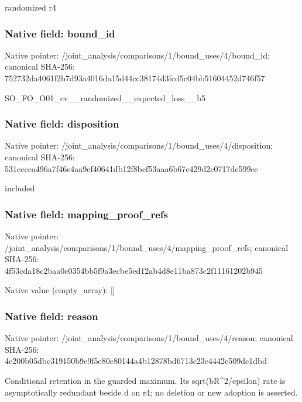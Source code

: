 \documentclass[10pt,a4paper]{article}
\begin{document}
\begingroup\raggedright\sloppy randomized r4\par\endgroup

\subsubsection{Native field: bound\_\allowbreak{}id}
Native pointer: /joint\_\allowbreak{}analysis/comparisons/1/bound\_\allowbreak{}uses/4/bound\_\allowbreak{}id; canonical SHA-256: 752732da4061f2b7d93a4016da15d44cc38174d3fcd5c04bb51604452d746f57

\begingroup\raggedright\sloppy SO\_\allowbreak{}FO\_\allowbreak{}O01\_\allowbreak{}cv\_\allowbreak{}\_\allowbreak{}randomized\_\allowbreak{}\_\allowbreak{}expected\_\allowbreak{}loss\_\allowbreak{}\_\allowbreak{}b5\par\endgroup

\subsubsection{Native field: disposition}
Native pointer: /joint\_\allowbreak{}analysis/comparisons/1/bound\_\allowbreak{}uses/4/disposition; canonical SHA-256: 531cecca496a7f46e4aa9ef40641db12f8bef53aaa6b67c429d2c0717dc599ce

\begingroup\raggedright\sloppy included\par\endgroup

\subsubsection{Native field: mapping\_\allowbreak{}proof\_\allowbreak{}refs}
Native pointer: /joint\_\allowbreak{}analysis/comparisons/1/bound\_\allowbreak{}uses/4/mapping\_\allowbreak{}proof\_\allowbreak{}refs; canonical SHA-256: 4f53cda18c2baa0c0354bb5f9a3ecbe5ed12ab4d8e11ba873c2f11161202b945

Native value (empty\_\allowbreak{}array): []

\subsubsection{Native field: reason}
Native pointer: /joint\_\allowbreak{}analysis/comparisons/1/bound\_\allowbreak{}uses/4/reason; canonical SHA-256: 4e200b05dbc319150b9e9f5e80c80144a4b12878bd6713c23e4442e509de1dbd

\begingroup\raggedright\sloppy Conditional retention in the guarded maximum. Its sqrt(bR\textasciicircum{}2/\allowbreak{}epsilon) rate is asymptotically redundant beside d on r4;\allowbreak{} no deletion or new adoption is asserted.\par\endgroup
\end{document}
